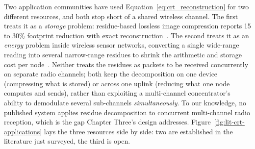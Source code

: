 \documentclass[12pt,a4paper,oneside]{book}
\begin{document}
Two application communities have used Equation~\ref{eq:crt_reconstruction}
for two different resources, and both stop short of a shared wireless
channel. The first treats it as a \emph{storage} problem: residue-based
lossless image compression reports 15 to 30\% footprint reduction with
exact reconstruction~\cite{vidhya2021crt}. The second treats it as an
\emph{energy} problem inside wireless sensor networks, converting a
single wide-range reading into several narrow-range residues to shrink the
arithmetic and storage cost per node~\cite{rahman2022rnsenergy,
khan2023fuzzycrt, djeddi2025parallelCRT}. Neither treats the residues as
packets to be received concurrently on separate radio channels; both keep
the decomposition on one device (compressing what is stored) or across one
uplink (reducing what one node computes and sends), rather than exploiting
a multi-channel concentrator's ability to demodulate several sub-channels
\emph{simultaneously}. To our knowledge, no published system applies
residue decomposition to concurrent multi-channel radio reception, which
is the gap Chapter Three's design addresses. Figure~\ref{fig:lit-crt-applications}
lays the three resources side by side: two are established in the
literature just surveyed, the third is open.
\end{document}

